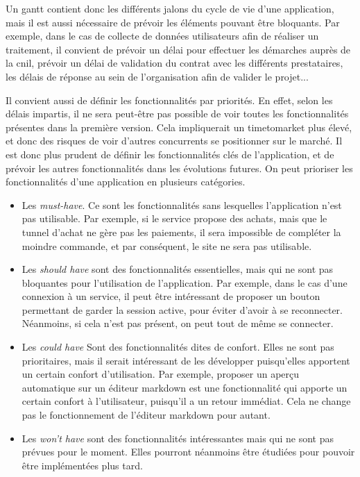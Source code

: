 
Un \gls{gantt} contient donc les différents jalons du cycle de vie d'une application, mais il est aussi nécessaire de prévoir les éléments pouvant être bloquants. Par exemple, dans le cas de collecte de données utilisateurs afin de réaliser un traitement, il convient de prévoir un délai pour effectuer les démarches auprès de la \gls{cnil}, prévoir un délai de validation du contrat avec les différents prestataires, les délais de réponse au sein de l'organisation afin de valider le projet...

Il convient aussi de définir les fonctionnalités par priorités. En effet, selon les délais impartis, il ne sera peut-être pas possible de voir toutes les fonctionnalités présentes dans la première version. Cela impliquerait un \gls{timetomarket} plus élevé, et donc des risques de voir d'autres concurrents se positionner sur le marché. Il est donc plus prudent de définir les fonctionnalités clés de l'application, et de prévoir les autres fonctionnalités dans les évolutions futures. On peut prioriser les fonctionnalités d'une application en plusieurs catégories.

\begin{itemize}
	\item Les \emph{must-have}. Ce sont les fonctionnalités sans lesquelles l'application n'est pas utilisable. Par exemple, si le service propose des achats, mais que le tunnel d'achat ne gère pas les paiements, il sera impossible de compléter la moindre commande, et par conséquent, le site ne sera pas utilisable.
	\item Les \emph{should have} sont des fonctionnalités essentielles, mais qui ne sont pas bloquantes pour l'utilisation de l'application. Par exemple, dans le cas d'une connexion à un service, il peut être intéressant de proposer un bouton permettant de garder la session active, pour éviter d'avoir à se reconnecter. Néanmoins, si cela n'est pas présent, on peut tout de même se connecter.
	\item Les \emph{could have} Sont des fonctionnalités dites de confort. Elles ne sont pas prioritaires, mais il serait intéressant de les développer puisqu'elles apportent un certain confort d'utilisation. Par exemple, proposer un aperçu automatique sur un éditeur \gls{markdown} est une fonctionnalité qui apporte un certain confort à l'utilisateur, puisqu'il a un retour immédiat. Cela ne change pas le fonctionnement de l'éditeur \gls{markdown} pour autant.
	\item Les \emph{won't have} sont des fonctionnalités intéressantes mais qui ne sont pas prévues pour le moment. Elles pourront néanmoins être étudiées pour pouvoir être implémentées plus tard. 
\end{itemize}

